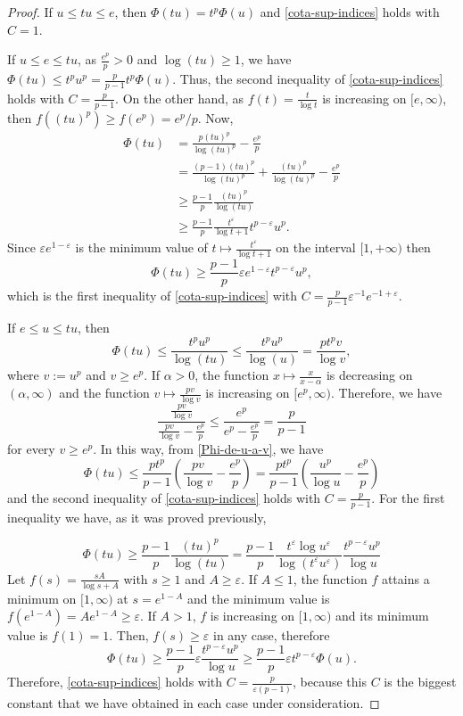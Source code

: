 \documentclass[twoside]{article}
\theoremstyle{remark}
\renewcommand{\leq}{\leqslant}
\renewcommand{\geq}{\geqslant}
\begin{document}
\begin{proof} If $u\leq tu\leq e$, then $\Phi(tu)=t^p\Phi(u)$ and \eqref{cota-sup-indices} holds with $C=1$.

If $u\leq e\leq tu$, as $\frac{e^p}{p}>0$  and $\log(tu)\geq 1$, we have
$\Phi(tu)\leq t^pu^p= \frac{p}{p-1}t^p\Phi(u)$. Thus, the second inequality of  \eqref{cota-sup-indices} holds with $C=\frac{p}{p-1}$. On the other hand, as $f(t)=\frac{t}{\log t}$ is increasing on $[e,\infty)$, then $f((tu)^p)\geq  f(e^p)=e^p/p$.
Now,
\[
\begin{split}
\Phi(tu)&=\frac{p(tu)^p}{\log (tu)^p}-\frac{e^p}{p}\\
&= \frac{(p-1)(tu)^p}{\log(tu)^p}+\frac{(tu)^p}{\log (tu)^p}-\frac{e^p}{p}
\\
&\geq \frac{p-1}{p}\frac{(tu)^p}{\log(tu)}\\
&\geq
\frac{p-1}{p}\frac{t^{\varepsilon}}{\log t+1}t^{p-\varepsilon}u^p.
\end{split}
\]
Since $\varepsilon e^{1-\varepsilon}$ is the minimum value of $t\mapsto\frac{t^{\varepsilon}}{\log t+1}$  on the interval $[1,+\infty)$ then
\[
\Phi(tu)\geq \frac{p-1}{p}\varepsilon e^{1-\varepsilon}t^{p-\varepsilon}u^p,
\]
which is the first inequality of \eqref{cota-sup-indices} with $C=\frac{p}{p-1}\varepsilon^{-1} e^{-1+\varepsilon}$.


If $e\leq u\leq tu$, then
\begin{equation}\label{Phi-de-u-a-v}
\Phi(tu)\leq \frac{t^pu^p}{\log(tu)}\leq \frac{t^pu^p}{\log(u)}=\frac{pt^pv}{\log v},
\end{equation} 
where $v:=u^p$ and $v\geq e^p$.  
If $\alpha>0$, the function $x\mapsto \frac{x}{x-\alpha}$ is decreasing on $(\alpha,\infty)$
and the function $v\mapsto \frac{pv}{\log v}$ is increasing  on $[e^p,\infty)$.
Therefore,  we have
\[
\frac{\frac{pv}{\log v}}{\frac{pv}{\log v}-\frac{e^p}{p}}\leq
\frac{e^p}{e^p-\frac{e^p}{p}}=\frac{p}{p-1}
\]
for every $v \geq e^p$. In this way, from \eqref{Phi-de-u-a-v}, we have
\[
\Phi(tu)\leq \frac{pt^p}{p-1}\left(\frac{pv}{\log v}-\frac{e^p}{p}\right)=
 \frac{pt^p}{p-1}\left(\frac{u^p}{\log u}-\frac{e^p}{p}\right)
\]
and the second inequality of  \eqref{cota-sup-indices} holds with $C=\frac{p}{p-1}$. For the first inequality we have, as it was proved previously,

\[
  \Phi(tu)
  \geq
  \frac{p-1}{p}\frac{(tu)^p}{\log(tu)}
  =
  \frac{p-1}{p}
  \frac{t^{\varepsilon} \log u^{\varepsilon}}{\log(t^{\varepsilon}u^{\varepsilon})}
  \frac{t^{p-\varepsilon}u^p}{\log u}
\]
Let $f(s)=\frac{sA}{\log s+A}$ with $s\geq 1$ and $A\geq \varepsilon$.  If $A\leq 1$,  the function $f$ attains a minimum on $[1,\infty)$ at $s=e^{1-A}$ and the minimum value is $f(e^{1-A})=Ae^{1-A}\geq \varepsilon$. If $A> 1$, $f$ is increasing  on $[1,\infty)$ and its minimum value is $f(1)=1$. Then, $f(s)\geq \varepsilon$ in any case,   therefore
\[
\Phi(tu)\geq \frac{p-1}{p}\varepsilon \frac{t^{p-\varepsilon}u^p}{\log u}\geq
\frac{p-1}{p}\varepsilon t^{p-\varepsilon}\Phi(u).
\]
Therefore, \eqref{cota-sup-indices} holds with $C=\frac{p}{\varepsilon (p-1)}$, because this $C$ is the biggest constant that we have obtained in each case under consideration.
\end{proof}
\end{document}
